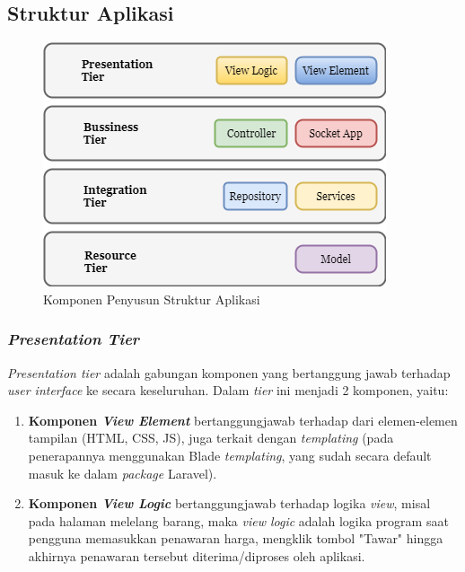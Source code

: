 
\subsection{Struktur Aplikasi}
\label{software-structure}

	\begin{figure}[H]
		\centering
		\includegraphics[width=.8\textwidth]{images/bab3/apl/main-apl.png}
		\caption{Komponen Penyusun Struktur Aplikasi}
		\label{software-structure-img}
	\end{figure}
	
	\subsubsection{\textit{Presentation Tier}}
		\textit{Presentation tier} adalah gabungan komponen yang bertanggung jawab terhadap \textit{user interface} ke secara keseluruhan. Dalam \textit{tier} ini  menjadi 2 komponen, yaitu:
		\begin{enumerate}
			\item \textbf{Komponen \textit{View Element}} bertanggungjawab terhadap dari elemen-elemen tampilan (HTML, CSS, JS), juga terkait dengan \textit{templating} (pada penerapannya menggunakan Blade \textit{templating}, yang sudah secara default masuk ke dalam \textit{package} Laravel).
			\item \textbf{Komponen \textit{View Logic}} bertanggungjawab terhadap logika \textit{view}, misal pada halaman melelang barang, maka \textit{view logic} adalah logika program saat pengguna memasukkan penawaran harga, mengklik tombol "Tawar" hingga akhirnya penawaran tersebut diterima/diproses oleh aplikasi.
		\end{enumerate}
		
		
